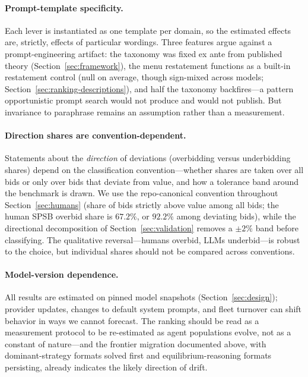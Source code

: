 \paragraph{Prompt-template specificity.} Each lever is instantiated as one template per domain, so the estimated effects are, strictly, effects of particular wordings. Three features argue against a prompt-engineering artifact: the taxonomy was fixed ex ante from published theory (Section~\ref{sec:framework}), the menu restatement functions as a built-in restatement control (null on average, though sign-mixed across models; Section~\ref{sec:ranking-descriptions}), and half the taxonomy backfires---a pattern opportunistic prompt search would not produce and would not publish. But invariance to paraphrase remains an assumption rather than a measurement. 

\paragraph{Direction shares are convention-dependent.} Statements about the \emph{direction} of deviations (overbidding versus underbidding shares) depend on the classification convention---whether shares are taken over all bids or only over bids that deviate from value, and how a tolerance band around the benchmark is drawn. We use the repo-canonical convention throughout Section~\ref{sec:humans} (share of bids strictly above value among all bids; the human SPSB overbid share is $67.2\%$, or $92.2\%$ among deviating bids), while the directional decomposition of Section~\ref{sec:validation} removes a $\pm2\%$ band before classifying. The qualitative reversal---humans overbid, LLMs underbid---is robust to the choice, but individual shares should not be compared across conventions.

\paragraph{Model-version dependence.} All results are estimated on pinned model snapshots (Section~\ref{sec:design}); provider updates, changes to default system prompts, and fleet turnover can shift behavior in ways we cannot forecast. The ranking should be read as a measurement protocol to be re-estimated as agent populations evolve, not as a constant of nature---and the frontier migration documented above, with dominant-strategy formats solved first and equilibrium-reasoning formats persisting, already indicates the likely direction of drift.
